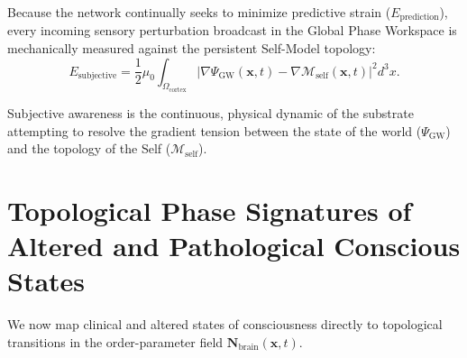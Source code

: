 \documentclass[11pt,a4paper]{article}
\begin{document}
	Because the network continually seeks to minimize predictive strain ($E_{\text{prediction}}$), every incoming sensory perturbation broadcast in the Global Phase Workspace is mechanically measured against the persistent Self-Model topology:
	\begin{equation}
		E_{\text{subjective}} = \frac{1}{2}\mu_0 \int_{\Omega_{\text{cortex}}} \left| \nabla \Psi_{\text{GW}}(\mathbf{x}, t) - \nabla \mathcal{M}_{\text{self}}(\mathbf{x}, t) \right|^2 d^3x.
		\label{eq:subjective_error}
	\end{equation}
	
	Subjective awareness is the continuous, physical dynamic of the substrate attempting to resolve the gradient tension between the state of the world ($\Psi_{\text{GW}}$) and the topology of the Self ($\mathcal{M}_{\text{self}}$). 
	
	\section{Topological Phase Signatures of Altered and Pathological Conscious States}
	\label{sec:conscious_states}
	
	We now map clinical and altered states of consciousness directly to topological transitions in the order-parameter field $\mathbf{N}_{\text{brain}}(\mathbf{x}, t)$.
	
\end{document}
